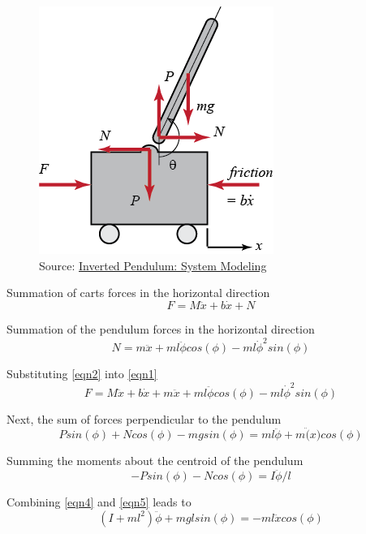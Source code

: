 \documentclass{article}
\begin{document}
\begin{figure}[!htb]
\centering
\includegraphics{pendulumfbd}
\caption{Source: \href{http://ctms.engin.umich.edu/CTMS/index.php?example=InvertedPendulum&section=SystemModeling}{Inverted Pendulum: System Modeling}}
\end{figure}

Summation of carts forces in the horizontal direction
\begin{equation} 
\label{eqn1}
F = M\ddot{x}+b\dot{x} + N
\end{equation}

Summation of the pendulum forces in the horizontal direction
\begin{equation} 
\label{eqn2}
N = m\ddot{x}+m l \ddot{\phi} cos(\phi)-m l \dot{\phi}^2sin(\phi)
\end{equation}

Substituting \ref{eqn2} into \ref{eqn1}
\begin{equation} 
\label{eqn3}
F = M\ddot{x}+b\dot{x} + m\ddot{x}+m l \ddot{\phi} cos(\phi)-m l \dot{\phi}^2sin(\phi)
\end{equation}

Next, the sum of forces perpendicular to the pendulum
\begin{equation} 
\label{eqn4}
Psin(\phi)+Ncos(\phi)-mgsin(\phi) = m l \ddot{\phi} + m\ddot(x)cos(\phi)
\end{equation}

Summing the moments about the centroid of the pendulum
\begin{equation} 
\label{eqn5}
-P sin(\phi)-N cos(\phi) = I \ddot{\phi}/l
\end{equation}

Combining \ref{eqn4} and \ref{eqn5} leads to 
\begin{equation} 
\label{eqn6}
(I+m l^2)\ddot{\phi} + m g lsin(\phi) = -m l \ddot{x} cos(\phi)
\end{equation}
\end{document}
